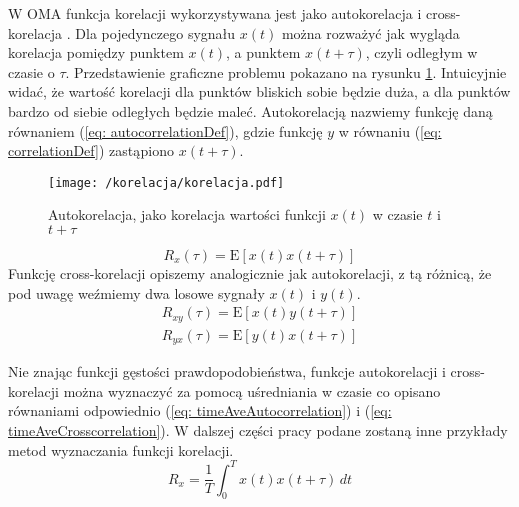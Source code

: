 W OMA funkcja korelacji wykorzystywana jest jako autokorelacja  i cross-korelacja . Dla pojedynczego sygnału $x(t)$ można rozważyć jak wygląda korelacja pomiędzy punktem $x(t)$, a punktem $x(t+\tau)$, czyli odległym w czasie o $\tau$. Przedstawienie graficzne problemu pokazano na rysunku \ref{fig: autocorrelationExample}. Intuicyjnie widać, że wartość korelacji dla punktów bliskich sobie będzie duża, a dla punktów bardzo od siebie odległych będzie maleć. Autokorelacją nazwiemy funkcję daną równaniem (\ref{eq: autocorrelationDef}), gdzie funkcję $y$ w równaniu (\ref{eq: correlationDef}) zastąpiono $x(t+\tau)$. 
\begin{figure}[h] 
	\centering
	\texttt{[image: /korelacja/korelacja.pdf]}
	\captionsetup{justification=centering}
	\caption{Autokorelacja, jako korelacja wartości funkcji $x(t)$ w czasie $t$ i $t+\tau$}
	\label{fig: autocorrelationExample}
\end{figure}
\begin{equation} \label{eq: autocorrelationDef}
	R_x(\tau)=\mathrm{E}[x(t)x(t+\tau)]
\end{equation}
Funkcję cross-korelacji opiszemy analogicznie jak autokorelacji, z tą różnicą, że pod uwagę weźmiemy dwa losowe sygnały $x(t)$ i $y(t)$.
\begin{equation} \label{eq: crosscorrelationDef}
	\begin{aligned}
		R_{xy}(\tau)=\mathrm{E}[x(t)y(t+\tau)]\\	
		R_{yx}(\tau)=\mathrm{E}[y(t)x(t+\tau)]
	\end{aligned}
\end{equation}

Nie znając funkcji gęstości prawdopodobieństwa, funkcje autokorelacji  i cross-korelacji można wyznaczyć za pomocą uśredniania w czasie co opisano równaniami odpowiednio (\ref{eq: timeAveAutocorrelation}) i (\ref{eq: timeAveCrosscorrelation}). W dalszej części pracy podane zostaną inne przykłady metod wyznaczania funkcji korelacji.
\begin{equation} \label{eq: timeAveAutocorrelation}
	R_x = \frac{1}{T}\int_{0}^{T}x(t)x(t+\tau) \,dt
\end{equation}

